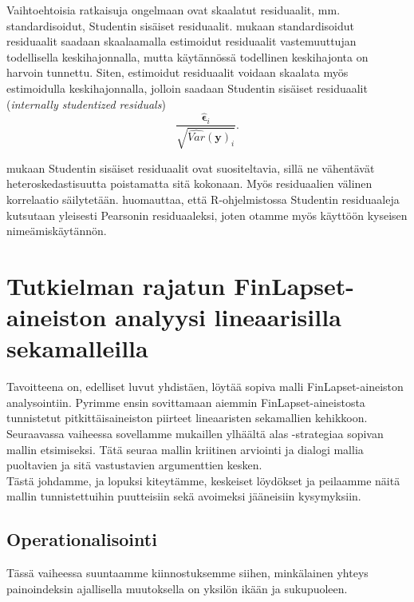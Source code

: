 \documentclass[finnish]{docopts}
\begin{document}
 Vaihtoehtoisia ratkaisuja ongelmaan ovat skaalatut residuaalit, mm. standardisoidut, Studentin sisäiset residuaalit. \cite{burzykowski13} mukaan standardisoidut residuaalit saadaan skaalaamalla estimoidut residuaalit vastemuuttujan todellisella keskihajonnalla, mutta käytännössä todellinen keskihajonta on harvoin tunnettu. Siten, estimoidut residuaalit voidaan skaalata myös estimoidulla keskihajonnalla, jolloin saadaan Studentin sisäiset residuaalit (\textit{internally studentized residuals})\\
 
 $$
 \frac{\hat{\bm{\epsilon}}_i}{\sqrt{\widehat{Var}(\bm{y})_i}}.
 $$
 
 \cite{burzykowski13} mukaan Studentin sisäiset residuaalit ovat suositeltavia, sillä ne vähentävät heteroskedastisuutta poistamatta sitä kokonaan. Myös residuaalien välinen korrelaatio säilytetään. \cite{burzykowski13} huomauttaa, että R-ohjelmistossa Studentin residuaaleja kutsutaan yleisesti Pearsonin residuaaleksi, joten otamme myös käyttöön kyseisen nimeämiskäytännön.\\
 
\section{Tutkielman rajatun FinLapset-aineiston analyysi lineaarisilla sekamalleilla}
\label{sec:lsmanalyysi}

Tavoitteena on, edelliset luvut yhdistäen, löytää sopiva malli FinLapset-aineiston analysointiin. Pyrimme ensin sovittamaan aiemmin FinLapset-aineistosta tunnistetut pitkittäisaineiston piirteet lineaaristen sekamallien kehikkoon.\\

Seuraavassa vaiheessa sovellamme \cite{west14, verbeke00} mukaillen ylhäältä alas -strategiaa sopivan mallin etsimiseksi. Tätä seuraa mallin kriitinen arviointi ja dialogi mallia puoltavien ja sitä vastustavien argumenttien kesken.\\

Tästä johdamme, ja lopuksi kiteytämme, keskeiset löydökset ja peilaamme näitä mallin tunnistettuihin puutteisiin sekä avoimeksi jääneisiin kysymyksiin.\\

\subsection{Operationalisointi}
\label{sub:operationalisointi}

Tässä vaiheessa suuntaamme kiinnostuksemme siihen, minkälainen yhteys painoindeksin ajallisella muutoksella on yksilön ikään ja sukupuoleen.\\
\end{document}

